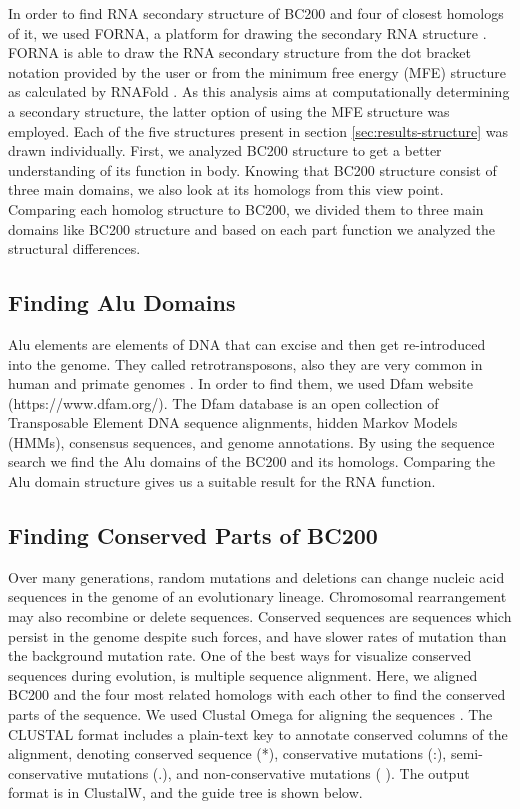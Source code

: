 \documentclass[conference, 11pt]{IEEEtran}
\begin{document}
In order to find RNA secondary structure of BC200 and four of closest homologs of it, we used FORNA, a platform for drawing the secondary RNA structure \cite{kerpedjiev2015forna}. 
FORNA is able to draw the RNA secondary structure from the dot bracket notation provided by the user or from the minimum free energy (MFE) structure as calculated by RNAFold \cite{lorenz2011viennarna}. 
As this analysis aims at computationally determining a secondary structure, the latter option of using the MFE structure was employed. 
Each of the five structures present in section \ref{sec:results-structure} was drawn individually. 
First, we analyzed BC200 structure to get a better understanding of its function in body. 
Knowing that BC200 structure consist of three main domains, we also look at its homologs from this view point. 
Comparing each homolog structure to BC200, we divided them to three main domains like BC200 structure and based on each part function we analyzed the structural differences.

\subsection{Finding Alu Domains}

Alu elements are elements of DNA that can excise and then get re-introduced into the genome. 
They called retrotransposons, also they are very common in human and primate genomes \cite{dombroski1994vivo}. 
In order to find them, we used Dfam website (https://www.dfam.org/). 
The Dfam database is an open collection of Transposable Element DNA sequence alignments, hidden Markov Models (HMMs), consensus sequences, and genome annotations. 
By using the sequence search we find the Alu domains of the BC200 and its homologs. 
Comparing the Alu domain structure gives us a suitable result for the RNA function.

\subsection{Finding Conserved Parts of BC200}
Over many generations, random mutations and deletions can change nucleic acid sequences in the genome of an evolutionary lineage. 
Chromosomal rearrangement may also recombine or delete sequences. 
Conserved sequences are sequences which persist in the genome despite such forces, and have slower rates of mutation than the background mutation rate\cite{kimura1974some}.
One of the best ways for visualize conserved sequences during evolution, is multiple sequence alignment. 
Here, we aligned BC200 and the four most related homologs with each other to find the conserved parts of the sequence. 
We used Clustal Omega for aligning the sequences \cite{madeira2019embl}. 
The CLUSTAL format includes a plain-text key to annotate conserved columns of the alignment, denoting conserved sequence (*), conservative mutations (:), semi-conservative mutations (.), and non-conservative mutations ( ). 
The output format is in ClustalW, and the guide tree is shown below.
\end{document}
